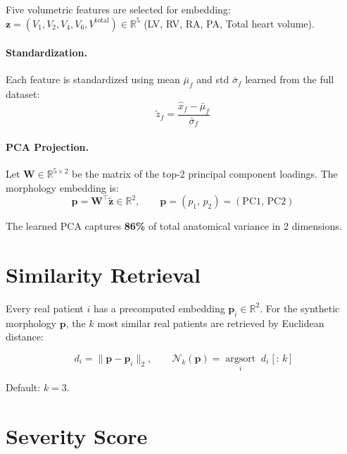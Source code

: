 \documentclass[11pt]{article}
\begin{document}
Five volumetric features are selected for embedding:
$\mathbf{z} = (V_1, V_2, V_4, V_6, V^\text{total}) \in \mathbb{R}^5$
(LV, RV, RA, PA, Total heart volume).

\paragraph{Standardization.}
Each feature is standardized using mean $\bar{\mu}_f$ and std $\bar{\sigma}_f$
learned from the full dataset:
\begin{equation}
    \tilde{z}_f = \frac{\hat{x}_f - \bar{\mu}_f}{\bar{\sigma}_f}
\end{equation}

\paragraph{PCA Projection.}
Let $\mathbf{W} \in \mathbb{R}^{5 \times 2}$ be the matrix of the top-2
principal component loadings. The morphology embedding is:
\begin{equation}
    \mathbf{p} = \mathbf{W}^\top \tilde{\mathbf{z}} \in \mathbb{R}^2,
    \qquad \mathbf{p} = (p_1,\, p_2) = (\text{PC1},\, \text{PC2})
\end{equation}

The learned PCA captures \textbf{86\%} of total anatomical variance in 2 dimensions.

\section{Similarity Retrieval}

Every real patient $i$ has a precomputed embedding $\mathbf{p}_i \in \mathbb{R}^2$.
For the synthetic morphology $\mathbf{p}$, the $k$ most similar real patients
are retrieved by Euclidean distance:

\begin{equation}
    d_i = \|\mathbf{p} - \mathbf{p}_i\|_2, \qquad
    \mathcal{N}_k(\mathbf{p}) = \underset{i}{\operatorname{argsort}}\; d_i \;\big[\,{:}\,k\,\big]
\end{equation}

Default: $k = 3$.

\section{Severity Score}
\end{document}
